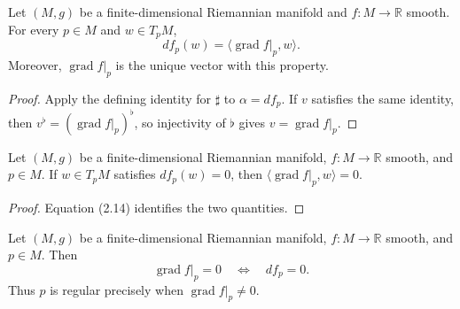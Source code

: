 \begin{lemma}
\label{lem:gradient-characterization}





Let $(M,g)$ be a finite-dimensional Riemannian manifold and $f\colon M\to\mathbb R$
smooth. For every $p\in M$ and $w\in T_pM$,
\[
df_p(w)=\langle\operatorname{grad}f|_p,w\rangle.
\]
Moreover, $\operatorname{grad}f|_p$ is the unique vector with this property.
\end{lemma}

\begin{proof}

\sketch Apply the defining identity for $\sharp$ to $\alpha=df_p$. If $v$ satisfies the
same identity, then $v^\flat=(\operatorname{grad}f|_p)^\flat$, so injectivity of
$\flat$ gives $v=\operatorname{grad}f|_p$.
\end{proof}

\begin{lemma}
\label{lem:gradient-orthogonal-kernel}





Let $(M,g)$ be a finite-dimensional Riemannian manifold, $f\colon M\to\mathbb R$
smooth, and $p\in M$. If $w\in T_pM$ satisfies $df_p(w)=0$, then
$\langle\operatorname{grad}f|_p,w\rangle=0$.
\end{lemma}

\begin{proof}

\sketch Equation (2.14) identifies the two quantities.
\end{proof}

\begin{lemma}
\label{lem:gradient-eq-zero-iff}





Let $(M,g)$ be a finite-dimensional Riemannian manifold, $f\colon M\to\mathbb R$
smooth, and $p\in M$. Then
\[
\operatorname{grad}f|_p=0\quad\Longleftrightarrow\quad df_p=0.
\]
Thus $p$ is regular precisely when $\operatorname{grad}f|_p\ne0$.
\end{lemma}

